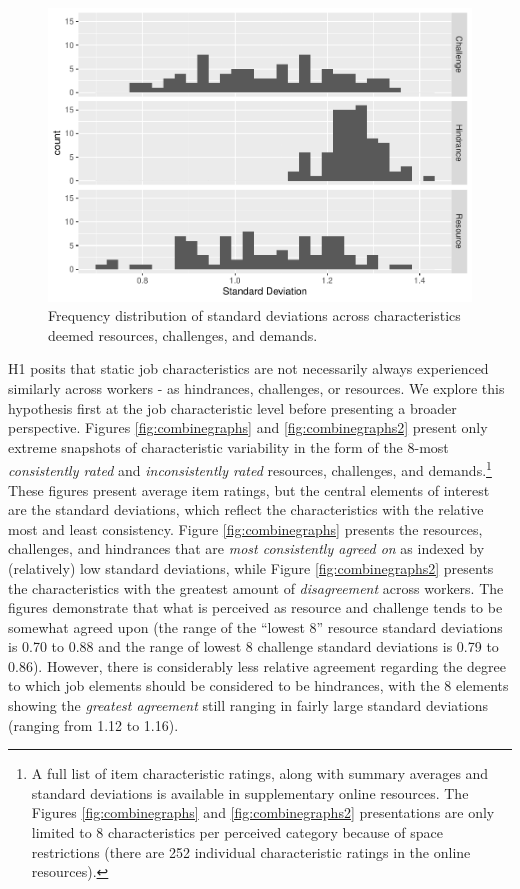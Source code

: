 \documentclass[
  man,mask]{apa7}
\begin{document}
\begin{figure}
\centering
\includegraphics{Submission_files/figure-latex/overallhist-1.pdf}
\caption{\label{fig:overallhist}Frequency distribution of standard deviations across characteristics deemed resources, challenges, and demands.}
\end{figure}

H1 posits that static job characteristics are not necessarily always experienced similarly across workers - as hindrances, challenges, or resources. We explore this hypothesis first at the job characteristic level before presenting a broader perspective. Figures \ref{fig:combinegraphs} and \ref{fig:combinegraphs2} present only extreme snapshots of characteristic variability in the form of the 8-most \emph{consistently rated} and \emph{inconsistently rated} resources, challenges, and demands.\footnote{A full list of item characteristic ratings, along with summary averages and standard deviations is available in supplementary online resources. The Figures \ref{fig:combinegraphs} and \ref{fig:combinegraphs2} presentations are only limited to 8 characteristics per perceived category because of space restrictions (there are 252 individual characteristic ratings in the online resources).} These figures present average item ratings, but the central elements of interest are the standard deviations, which reflect the characteristics with the relative most and least consistency. Figure \ref{fig:combinegraphs} presents the resources, challenges, and hindrances that are \emph{most consistently agreed on} as indexed by (relatively) low standard deviations, while Figure \ref{fig:combinegraphs2} presents the characteristics with the greatest amount of \emph{disagreement} across workers. The figures demonstrate that what is perceived as resource and challenge tends to be somewhat agreed upon (the range of the ``lowest 8'' resource standard deviations is 0.70 to 0.88 and the range of lowest 8 challenge standard deviations is 0.79 to 0.86). However, there is considerably less relative agreement regarding the degree to which job elements should be considered to be hindrances, with the 8 elements showing the \emph{greatest agreement} still ranging in fairly large standard deviations (ranging from 1.12 to 1.16).
\end{document}
